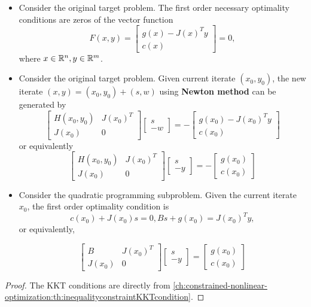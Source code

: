 \begin{refsection}
\begin{lemma}\hfill
\begin{itemize}
	\item Consider the original target problem. The first order necessary optimality conditions are zeros of the vector function
	$$F(x,y) = \begin{bmatrix}
	g(x) - J(x)^Ty\\
	c(x)
	\end{bmatrix} = 0,$$
	where $x\in \mathbb{R}^n,y\in\mathbb{R}^m$.
	\item  Consider the original target problem.  Given current iterate $(x_0,y_0)$, the new iterate $(x,y) = (x_0,y_0) + (s,w)$ using \textbf{Newton method} can be generated by
	$$\begin{bmatrix}
	H(x_0,y_0) & J(x_0)^T\\
	J(x_0) & 0
	\end{bmatrix}\begin{bmatrix}
	s\\
	-w
	\end{bmatrix} = -\begin{bmatrix}
	g(x_0) - J(x_0)^Ty\\
	c(x_0)
	\end{bmatrix}$$
	or equivalently
	$$\begin{bmatrix}
	H(x_0,y_0) & J(x_0)^T\\
	J(x_0) & 0
	\end{bmatrix}\begin{bmatrix}
	s\\
	-y
	\end{bmatrix} = -\begin{bmatrix}
	g(x_0)\\
	c(x_0)
	\end{bmatrix}$$
	\item Consider the quadratic programming subproblem. Given the current iterate $x_0$, the first order optimality condition is
	$$c(x_0) + J(x_0)s = 0, Bs + g(x_0) = J(x_0)^Ty,$$
	or equivalently,
	
	$$\begin{bmatrix}
	B & J(x_0)^T\\
	J(x_0) & 0
	\end{bmatrix}\begin{bmatrix}
	s\\
	-y
	\end{bmatrix} = \begin{bmatrix}
	g(x_0)\\
	c(x_0)
	\end{bmatrix}$$
\end{itemize}
\end{lemma}
\begin{proof}
The KKT conditions are directly from \autoref{ch:constrained-nonlinear-optimization:th:inequalityconstraintKKTcondition}.
\end{proof}



\end{refsection}
